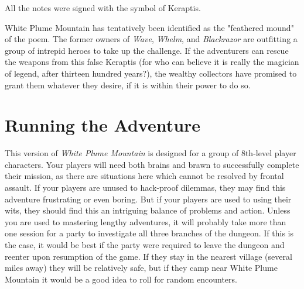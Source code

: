 \documentclass[10pt,a4paper,twoside,bg=print,twocolumn,openany,nodeprecatedcode]{dndbook}
\begin{document}
All the notes were signed with the symbol of Keraptis.

White Plume Mountain has tentatively been identified as the "feathered mound" of the poem. The former owners of \textit{Wave}, \textit{Whelm}, and \textit{Blackrazor} are outfitting a group of intrepid heroes to take up the challenge. If the adventurers can rescue the weapons from this false Keraptis (for who can believe it is really the magician of legend, after thirteen hundred years?), the wealthy collectors have promised to grant them whatever they desire, if it is within their power to do so.

\section{Running the Adventure}
This version of \textit{White Plume Mountain} is designed for a group of 8th-level player characters. Your players will need both brains and brawn to successfully complete their mission, as there are situations here which cannot be resolved by frontal assault. If your players are unused to hack-proof dilemmas, they may find this adventure frustrating or even boring. But if your players are used to using their wits, they should find this an intriguing balance of problems and action. Unless you are used to mastering lengthy adventures, it will probably take more than one session for a party to investigate all three branches of the dungeon. If this is the case, it would be best if the party were required to leave the dungeon and reenter upon resumption of the game. If they stay in the nearest village (several miles away) they will be relatively safe, but if they camp near White Plume Mountain it would be a good idea to roll for random encounters.
\end{document}
